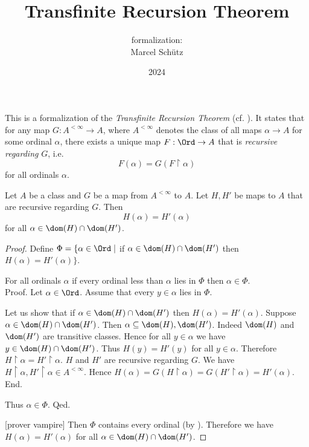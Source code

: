\documentclass{article}
\title{Transfinite Recursion Theorem}
\author{\Naproche formalization:\\[0.5em]Marcel Schütz}
\date{2024}
\begin{document}
  \maketitle

  
  \noindent This is a formalization of the \emph{Transfinite Recursion Theorem}
  (cf. \cite{Koepke2018}).
  It states that for any map $G : A^{< \infty} \to A$, where $A^{< \infty}$
  denotes the class of all maps $\alpha \to A$ for some ordinal $\alpha$, there
  exists a unique map $F: \Ord \to A$ that is \emph{recursive regarding} $G$,
  i.e. \[F(\alpha) = G(F \restriction \alpha)\] for all ordinals $\alpha$.

  \begin{forthel}
    \begin{lemma*}[title=Coincidence Lemma,id=coincidence]
      Let $A$ be a class and $G$ be a map from $A^{< \infty}$ to $A$.
      Let $H, H'$ be maps to $A$ that are recursive regarding $G$.
      Then \[ H(\alpha) = H'(\alpha) \] for all $\alpha \in \dom(H) \cap \dom(H')$.
    \end{lemma*}
    \begin{proof}
      Define $\Phi = \{ \alpha \in \Ord \mid$ if
      $\alpha \in \dom(H) \cap \dom(H')$ then $H(\alpha) = H'(\alpha) \}$.

      For all ordinals $\alpha$ if every ordinal less than $\alpha$ lies in $\Phi$ then $\alpha \in \Phi$. \\
      Proof.
        Let $\alpha \in \Ord$.
        Assume that every $y \in \alpha$ lies in $\Phi$.

        Let us show that if $\alpha \in \dom(H) \cap \dom(H')$ then
        $H(\alpha) = H'(\alpha)$.
          Suppose $\alpha \in \dom(H) \cap \dom(H')$.
          Then $\alpha \subseteq \dom(H), \dom(H')$.
          Indeed $\dom(H)$ and $\dom(H')$ are transitive classes.
          Hence for all $y \in \alpha$ we have $y \in \dom(H) \cap \dom(H')$.
          Thus $H(y) = H'(y)$ for all $y \in \alpha$.
          Therefore $H \restriction \alpha = H' \restriction \alpha$.
          $H$ and $H'$ are recursive regarding $G$.
          We have $H \restriction \alpha, H' \restriction \alpha \in A^{< \infty}$.
          Hence $H(\alpha)
            = G(H \restriction \alpha)
            = G(H' \restriction \alpha)
            = H'(\alpha)$.
        End.

        Thus $\alpha \in \Phi$.
      Qed.

      [prover vampire]
      Then $\Phi$ contains every ordinal (by ).
      Therefore we have $H(\alpha) = H'(\alpha)$ for all $\alpha \in \dom(H) \cap \dom(H')$.
    \end{proof}
  \end{forthel}
\end{document}
